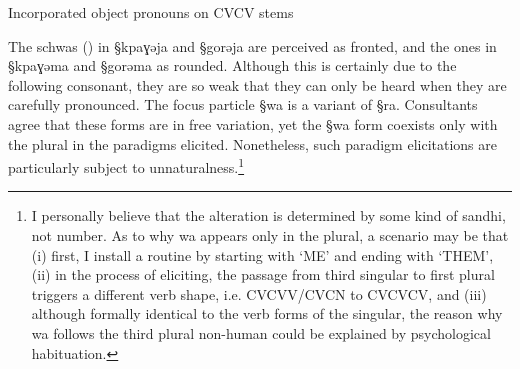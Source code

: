 \begin{table}[!htb]
\centering
\caption{Incorporated object pronouns on  CVCV stems
\label{tab:object-clitic-CVCV}}

\quad
{}
\end{table}
The schwas ({\I [ə]}) in {\S kpaɣəja} and  {\S gorəja} are perceived as fronted,
and the ones in {\S kpaɣəma} and {\S gorəma}  as rounded. Although this is
certainly due to the following consonant, they are so weak that they can only be
heard when they are carefully pronounced. The focus particle {\S wa} is a
variant of {\S ra}. Consultants  agree that these forms are in free variation,
yet the {\S wa} form coexists only with  the plural in the paradigms elicited.
Nonetheless, such paradigm elicitations are particularly subject to
unnaturalness.\footnote{I personally believe that the alteration is
determined by some kind of sandhi, not number. As to why {\F wa} appears only in
the plural, a scenario may be that (i) first, I install a routine by starting
with `ME' and ending with `THEM', (ii) in the process of eliciting, the passage
from third singular to first plural triggers  a different verb shape, i.e.
CVCVV/CVCN  to CVCVCV, and (iii)  although formally identical to the verb forms
of the singular, the reason why {\F wa} follows the third plural non-human could
be explained by psychological habituation.}

